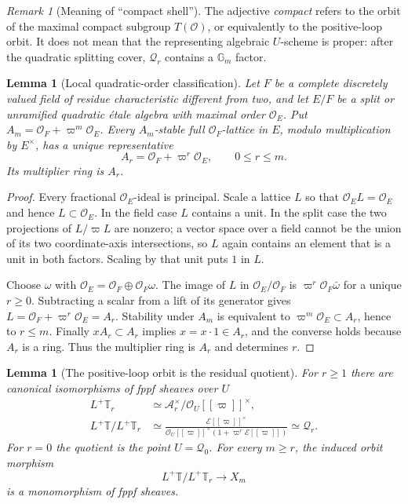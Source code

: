 \documentclass[11pt]{article}
\newtheorem{lemma}[theorem]{Lemma}
\theoremstyle{definition}
\theoremstyle{remark}
\newtheorem{remark}[theorem]{Remark}
\begin{document}
\begin{remark}[Meaning of ``compact shell'']
The adjective \emph{compact} refers to the orbit of the maximal compact
subgroup $T(\mathcal O)$, or equivalently to the positive-loop orbit.  It does
not mean that the representing algebraic $U$-scheme is proper: after the
quadratic splitting cover, $\mathscr Q_r$ contains a $\mathbb G_m$ factor.
\end{remark}

\begin{lemma}[Local quadratic-order classification]
\label{lem:PGL2-local-order-classification}
Let $F$ be a complete discretely valued field of residue characteristic
different from two, and let $E/F$ be a split or unramified quadratic
\'etale algebra with maximal order $\mathcal O_E$.  Put
$A_m=\mathcal O_F+\varpi^m\mathcal O_E$.  Every $A_m$-stable full
$\mathcal O_F$-lattice in $E$, modulo multiplication by $E^\times$, has a
unique representative
\[
 A_r=\mathcal O_F+\varpi^r\mathcal O_E,
 \qquad 0\le r\le m.
\]
Its multiplier ring is $A_r$.
\end{lemma}

\begin{proof}
Every fractional $\mathcal O_E$-ideal is principal.  Scale a lattice $L$ so
that $\mathcal O_EL=\mathcal O_E$ and hence $L\subset\mathcal O_E$.  In the
field case $L$ contains a unit.  In the split case the two projections of
$L/\varpi L$ are nonzero; a vector space over a field cannot be the union of
its two coordinate-axis intersections, so $L$ again contains an element that
is a unit in both factors.  Scaling by that unit puts $1$ in $L$.

Choose $\omega$ with
$\mathcal O_E=\mathcal O_F\oplus\mathcal O_F\omega$.  The image of $L$ in
$\mathcal O_E/\mathcal O_F$ is
$\varpi^r\mathcal O_F\bar\omega$ for a unique $r\ge0$.  Subtracting a scalar
from a lift of its generator gives
$L=\mathcal O_F+\varpi^r\mathcal O_E=A_r$.  Stability under $A_m$ is
equivalent to $\varpi^m\mathcal O_E\subset A_r$, hence to $r\le m$.
Finally $xA_r\subset A_r$ implies $x=x\cdot1\in A_r$, and the converse holds
because $A_r$ is a ring.  Thus the multiplier ring is $A_r$ and determines
$r$.
\end{proof}

\begin{lemma}[The positive-loop orbit is the residual quotient]
\label{lem:PGL2-loop-orbit-quotient}
For $r\ge1$ there are canonical isomorphisms of fppf sheaves over $U$
\begin{align}
 L^+\mathbb T_r
 &\simeq
 \mathcal A_r^\times/\mathcal O_U[[\varpi]]^\times,
 \label{eq:PGL2-loop-stabilizer}\\
 L^+\mathbb T/L^+\mathbb T_r
 &\simeq
 \frac{\mathcal E[[\varpi]]^\times}
 {\mathcal O_U[[\varpi]]^\times(1+\varpi^r\mathcal E[[\varpi]])}
 \simeq \mathscr Q_r.
 \label{eq:PGL2-loop-quotient-Qr}
\end{align}
For $r=0$ the quotient is the point $U=\mathscr Q_0$.
For every $m\ge r$, the induced orbit morphism
\[
 L^+\mathbb T/L^+\mathbb T_r\longrightarrow X_m
\]
is a monomorphism of fppf sheaves.
\end{lemma}
\end{document}
